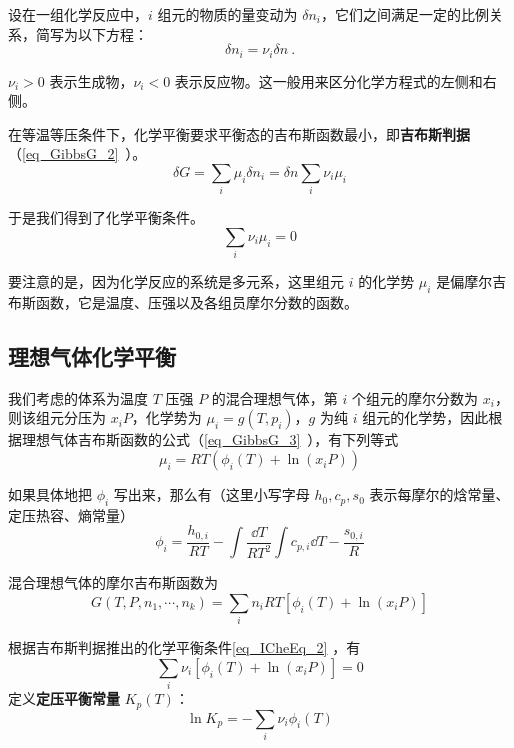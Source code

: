 

设在一组化学反应中，$i$ 组元的物质的量变动为 $\delta n_i$，它们之间满足一定的比例关系，简写为以下方程：
\begin{equation}
\delta n_i=\nu_i \delta n~.
\end{equation}

$\nu_i>0$ 表示生成物，$\nu_i<0$ 表示反应物。这一般用来区分化学方程式的左侧和右侧。

在等温等压条件下，化学平衡要求平衡态的吉布斯函数最小，即\textbf{吉布斯判据}（\autoref{eq_GibbsG_2}~）。
\begin{equation}
\delta G=\sum_i \mu_i\delta n_i=\delta n\sum_i \nu_i\mu_i
\end{equation}

于是我们得到了化学平衡条件。
\begin{equation}\label{eq_ICheEq_2}
\sum_i\nu_i\mu_i=0
\end{equation}

要注意的是，因为化学反应的系统是多元系，这里组元 $i$ 的化学势 $\mu_i$ 是偏摩尔吉布斯函数，它是温度、压强以及各组员摩尔分数的函数。

\subsection{理想气体化学平衡}

我们考虑的体系为温度 $T$ 压强 $P$ 的混合理想气体，第 $i$ 个组元的摩尔分数为 $x_i$，则该组元分压为 $x_iP$，化学势为 $\mu_i=g(T,p_i)$，$g$ 为纯 $i$ 组元的化学势，因此根据理想气体吉布斯函数的公式（\autoref{eq_GibbsG_3}~），有下列等式
\begin{equation}\label{eq_ICheEq_1}
\mu_i=RT(\phi_i(T)+\ln(x_iP))
\end{equation}

如果具体地把 $\phi_i$ 写出来，那么有（这里小写字母 $h_0,c_p,s_0$ 表示每摩尔的焓常量、定压热容、熵常量）
\begin{equation}
\phi_i=\frac{h_{0,i}}{RT}-\int\frac{\dd T}{RT^2}\int c_{p,i}\dd T-\frac{s_{0,i}}{R}
\end{equation}

混合理想气体的摩尔吉布斯函数为
\begin{equation}
G(T,P,n_1,\cdots,n_k)=\sum_i n_iRT[\phi_i(T)+\ln(x_iP)]
\end{equation}

根据吉布斯判据推出的化学平衡条件\autoref{eq_ICheEq_2} ，有
\begin{equation}\label{eq_ICheEq_3}
\sum_i\nu_i[\phi_i(T)+\ln (x_iP)]=0
\end{equation}
定义\textbf{定压平衡常量} $K_p(T)$：
\begin{equation}\label{eq_ICheEq_5}
\ln K_p=-\sum_i\nu_i\phi_i(T)
\end{equation}

